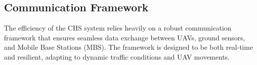 


\subsection{Communication Framework}

The efficiency of the CHS system relies heavily on a robust communication framework that ensures seamless data exchange between UAVs, ground sensors, and Mobile Base Stations (MBS). The framework is designed to be both real-time and resilient, adapting to dynamic traffic conditions and UAV movements.

